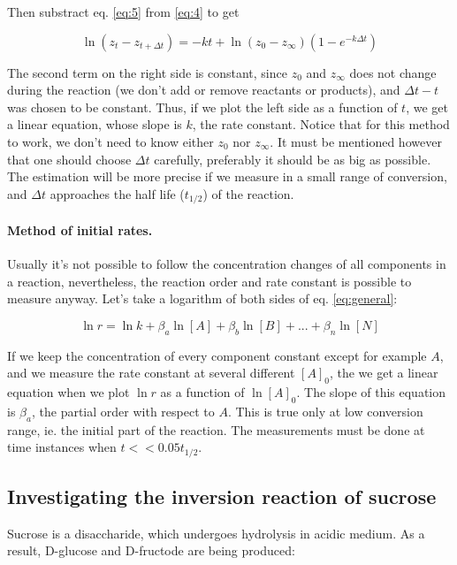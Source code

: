 Then substract eq. \ref{eq:5} from \ref{eq:4} to get

\begin{equation}
\label{eq:6}
        \ln (z_t - z_{t+\Delta t})
	=
	-kt
	+ \ln (z_0 - z_{\infty}) (1- e^{-k \Delta t})
\end{equation}

The second term on the right side is constant, since $z_0$ and $z_\infty$ does not change during the reaction (we don't add or remove reactants or products), and $\Delta t - t$ was chosen to be constant.
Thus, if we plot the left side as a function of $t$, we get a linear equation, whose slope is $k$, the rate constant.
Notice that for this method to work, we don't need to know either $z_0$ nor $z_\infty$. 
It must be mentioned however that one should choose $\Delta t$ carefully, preferably it should be as big as possible.
The estimation will be more precise if we measure in a small range of conversion, and $\Delta t$ approaches the half life ($t_{1/2}$) of the reaction.

\paragraph{Method of initial rates.}
Usually it's not possible to follow the concentration changes of all components in a reaction, nevertheless, the reaction order and rate constant is possible to measure anyway. Let's take a logarithm of both sides of eq. \ref{eq:general}: 

\begin{equation}
\label{eq:log}
	\ln r
	=
	\ln k
	+ \beta _a \ln [A]
	+ \beta _b \ln [B]
	+ ...
	+ \beta _n \ln [N]
\end{equation}

If we keep the concentration of every component constant except for example $A$, and we measure the rate constant at several different $[A]_0$, the we get a linear equation when we plot $\ln r$ as a function of $\ln [A]_0$. The slope of this equation is $\beta _a$, the partial order with respect to $A$.
This is true only at low conversion range, ie. the initial part of the reaction. The measurements must be done at time instances when $t << 0.05 t_{1/2}$.

\subsection{Investigating the inversion reaction of sucrose}
Sucrose is a disaccharide, which undergoes hydrolysis in acidic medium. As a result, D-glucose and D-fructode are being produced:

